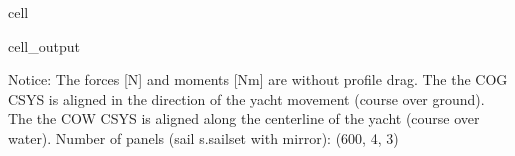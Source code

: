 \documentclass[letterpaper,10pt,english]{jupyterBook}
\begin{document}
\begin{sphinxuseclass}{cell}
\begin{sphinxVerbatimOutput}
\begin{sphinxuseclass}{cell_output}
\begin{sphinxVerbatim}[commandchars=\\\{\}]
\PYGZhy{}\PYGZhy{}\PYGZhy{}\PYGZhy{}\PYGZhy{}\PYGZhy{}\PYGZhy{}\PYGZhy{}\PYGZhy{}\PYGZhy{}\PYGZhy{}\PYGZhy{}\PYGZhy{}\PYGZhy{}\PYGZhy{}\PYGZhy{}\PYGZhy{}\PYGZhy{}\PYGZhy{}\PYGZhy{}\PYGZhy{}\PYGZhy{}\PYGZhy{}\PYGZhy{}\PYGZhy{}\PYGZhy{}\PYGZhy{}\PYGZhy{}\PYGZhy{}\PYGZhy{}\PYGZhy{}\PYGZhy{}\PYGZhy{}\PYGZhy{}\PYGZhy{}\PYGZhy{}\PYGZhy{}\PYGZhy{}\PYGZhy{}\PYGZhy{}\PYGZhy{}\PYGZhy{}\PYGZhy{}\PYGZhy{}\PYGZhy{}\PYGZhy{}\PYGZhy{}\PYGZhy{}\PYGZhy{}\PYGZhy{}\PYGZhy{}\PYGZhy{}\PYGZhy{}\PYGZhy{}\PYGZhy{}\PYGZhy{}\PYGZhy{}\PYGZhy{}\PYGZhy{}\PYGZhy{}\PYGZhy{}
\end{sphinxVerbatim}

\begin{sphinxVerbatim}[commandchars=\\\{\}]
Notice:
	The forces [N] and moments [Nm] are without profile drag.
	The the \PYGZus{}COG\PYGZus{} CSYS is aligned in the direction of the yacht movement (course over ground).
	The the \PYGZus{}COW\PYGZus{} CSYS is aligned along the centerline of the yacht (course over water).
	Number of panels (sail s.sail\PYGZus{}set with mirror): (600, 4, 3)
\end{sphinxVerbatim}


\end{sphinxuseclass}
\end{sphinxVerbatimOutput}
\end{sphinxuseclass}
\end{document}
